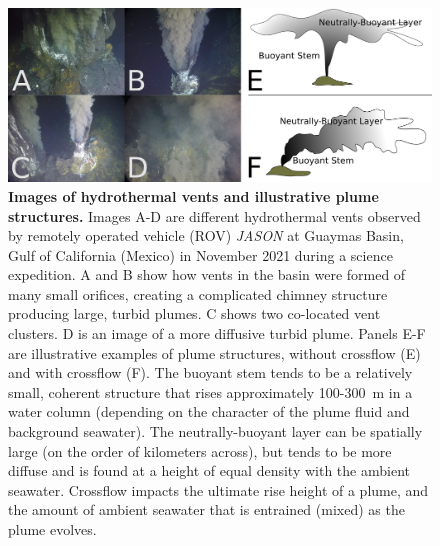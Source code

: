 \begin{figure}[h!]
  \centering
  \includegraphics[width=1\columnwidth]{figures/intro_hydro.png}
  \caption[Images of hydrothermal vents and illustrative plume structures.]{\textbf{Images of hydrothermal vents and illustrative plume structures.} Images A-D are different hydrothermal vents observed by remotely operated vehicle (ROV) \emph{JASON} at Guaymas Basin, Gulf of California (Mexico) in November 2021 during a science expedition. A and B show how vents in the basin were formed of many small orifices, creating a complicated chimney structure producing large, turbid plumes. C shows two co-located vent clusters. D is an image of a more diffusive turbid plume. Panels E-F are illustrative examples of plume structures, without crossflow (E) and with crossflow (F). The buoyant stem tends to be a relatively small, coherent structure that rises approximately 100-\SI{300}{\meter} in a water column (depending on the character of the plume fluid and background seawater). The neutrally-buoyant layer can be spatially large (on the order of kilometers across), but tends to be more diffuse and is found at a height of equal density with the ambient seawater. Crossflow impacts the ultimate rise height of a plume, and the amount of ambient seawater that is entrained (mixed) as the plume evolves.}
  \label{fig:intro_hydro}
\end{figure}


